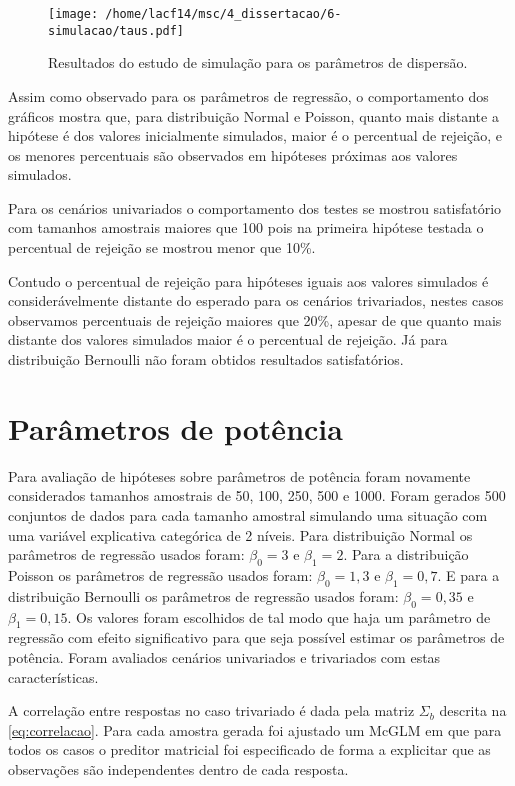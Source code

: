 \begin{figure}[H]
\centering
\texttt{[image: /home/lacf14/msc/4\_dissertacao/6-simulacao/taus.pdf]}
\caption{Resultados do estudo de simulação para os parâmetros de dispersão.}
\label{fig:taus}
\end{figure}

Assim como observado para os parâmetros de regressão, o comportamento dos gráficos mostra que, para distribuição Normal e Poisson, quanto mais distante a hipótese é dos valores inicialmente simulados, maior é o percentual de rejeição, e os menores percentuais são observados em hipóteses próximas aos valores simulados. 

Para os cenários univariados o comportamento dos testes se mostrou satisfatório com tamanhos amostrais maiores que 100 pois na primeira hipótese testada o percentual de rejeição se mostrou menor que 10\%.

Contudo o percentual de rejeição para hipóteses iguais aos valores simulados é considerávelmente distante do esperado para os cenários trivariados, nestes casos observamos percentuais de rejeição maiores que 20\%, apesar de que quanto mais distante dos valores simulados maior é o percentual de rejeição. Já para distribuição Bernoulli não foram obtidos resultados satisfatórios.

\section{Parâmetros de potência}

Para avaliação de hipóteses sobre parâmetros de potência foram novamente considerados tamanhos amostrais de 50, 100, 250, 500 e 1000. Foram gerados 500 conjuntos de dados para cada tamanho amostral simulando uma situação com uma variável explicativa categórica de 2 níveis. Para distribuição Normal os parâmetros de regressão usados foram: $\beta_0 = 3$ e $\beta_1 = 2$. Para a distribuição Poisson os parâmetros de regressão usados foram: $\beta_0 = 1,3$ e $\beta_1 = 0,7$. E para a distribuição Bernoulli os parâmetros de regressão usados foram: $\beta_0 = 0,35$ e $\beta_1 = 0,15$. Os valores foram escolhidos de tal modo que haja um parâmetro de regressão com efeito significativo para que seja possível estimar os parâmetros de potência. Foram avaliados cenários univariados e trivariados com estas características.

A correlação entre respostas no caso trivariado é dada pela matriz $\Sigma_b$ descrita na \autoref{eq:correlacao}. Para cada amostra gerada foi ajustado um McGLM em que para todos os casos o preditor matricial foi especificado de forma a explicitar que as observações são independentes dentro de cada resposta.

